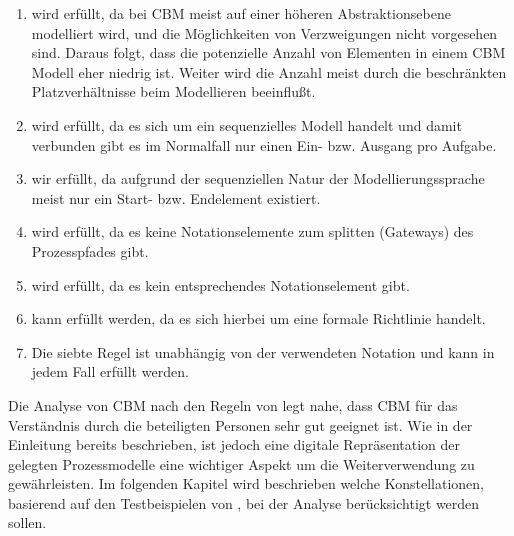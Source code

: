 \begin{enumerate}
	\item wird erfüllt, da bei CBM meist auf einer höheren Abstraktionsebene modelliert wird, und die Möglichkeiten von Verzweigungen nicht vorgesehen sind. Daraus folgt, dass die potenzielle Anzahl von Elementen in einem CBM Modell eher niedrig ist. Weiter wird die Anzahl meist durch die beschränkten Platzverhältnisse beim Modellieren beeinflußt. 
	\item wird erfüllt, da es sich um ein sequenzielles Modell handelt und damit verbunden gibt es im Normalfall nur einen Ein- bzw. Ausgang pro Aufgabe.
	\item wir erfüllt, da aufgrund der sequenziellen Natur der Modellierungssprache meist nur ein Start- bzw. Endelement existiert.
	\item wird erfüllt, da es keine Notationselemente zum splitten (Gateways) des Prozesspfades gibt. 
	\item wird erfüllt, da es kein entsprechendes Notationselement gibt. 
	\item kann erfüllt werden, da es sich hierbei um eine formale Richtlinie handelt.
	\item Die siebte Regel ist unabhängig von der verwendeten Notation und kann in jedem Fall erfüllt werden.
\end{enumerate}

Die Analyse von CBM nach den Regeln von \citet{MENDLING2010127} legt nahe, dass CBM für das Verständnis durch die beteiligten Personen sehr gut geeignet ist. Wie in der Einleitung bereits beschrieben, ist jedoch eine digitale Repräsentation der gelegten Prozessmodelle eine wichtiger Aspekt um die Weiterverwendung zu gewährleisten. Im folgenden Kapitel wird beschrieben welche Konstellationen, basierend auf den Testbeispielen von \citet{max}, bei der Analyse berücksichtigt werden sollen.

